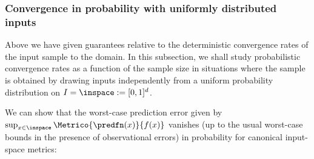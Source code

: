 \subsubsection{Convergence in probability with uniformly distributed inputs}
\label{sec:probconv_LACKI}
Above we have given guarantees relative to the deterministic convergence rates of the input sample to the domain.
In this subsection, we shall study probabilistic convergence rates as a function of the sample size in situations where the sample is obtained by drawing inputs independently from a uniform probability distribution on $I=\inspace := [0,1]^d$. 

We can show that the worst-case prediction error given by $\sup_{x \in \inspace}\Metrico{\predfn(x)}{ f(x)}$ vanishes (up to the usual worst-case bounds in the presence of observational errors) in probability for canonical input-space metrics:  

%
%

